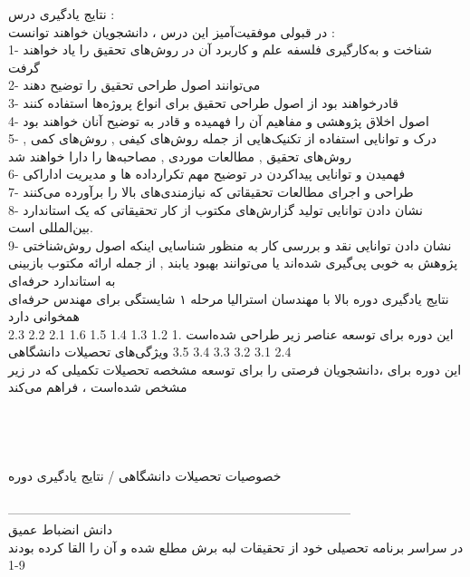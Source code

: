 \documentclass[a4 paper,12pt]{article}\usepackage{float, graphicx,xepersian }
\begin{document}
                                                     
                                                                                       \noindent                               
نتایج یادگیری درس :\\
در قبولی موفقیت‌آمیز این درس ، دانشجویان خواهند توانست : \\
1- شناخت و به‌کارگیری فلسفه علم و کاربرد آن در روش‌های تحقیق را یاد خواهند گرفت\\
2- می‌توانند اصول طراحی تحقیق را توضیح دهند\\
3- قادرخواهند بود از اصول طراحی تحقیق برای انواع پروژه‌ها استفاده کنند\\
4- اصول اخلاق پژوهشی و مفاهیم آن را فهمیده و قادر به توضیح آنان خواهند بود\\
5- درک و توانایی استفاده از تکنیک‌هایی از جمله روش‌های کیفی , روش‌های کمی , روش‌های تحقیق , مطالعات موردی , مصاحبه‌ها را دارا خواهند شد\\
6- فهمیدن و توانایی پیداکردن در توضیح مهم تکرارداده ها و مدیریت اداراکی\\
7-   طراحی و اجرای مطالعات تحقیقاتی که نیازمندی‌های بالا را برآورده می‌کنند \\
8- نشان دادن توانایی تولید گزارش‌های مکتوب از کار تحقیقاتی که یک استاندارد بین‌المللی است.\\
9- نشان دادن توانایی نقد و بررسی کار به منظور شناسایی اینکه اصول روش‌شناختی پژوهش به خوبی پی‌گیری شده‌اند یا می‌توانند بهبود یابند , از جمله ارائه مکتوب بازبینی به استاندارد حرفه‌ای \\
نتایج یادگیری دوره بالا با مهندسان استرالیا مرحله ۱ شایستگی برای مهندس حرفه‌ای همخوانی دارد \\
این دوره برای توسعه عناصر زیر طراحی شده‌است .1   1.2   1.3   1.4   1.5   1.6   2.1   2.2   2.3   2.4   3.1   3.2   3.3   3.4   3.5   
ویژگی‌های تحصیلات دانشگاهی\\
این دوره برای ،دانشجویان فرصتی را برای توسعه مشخصه تحصیلات تکمیلی که در زیر مشخص شده‌است ، فراهم می‌کند\\
\\
\\
\\
\\ 
خصوصیات تحصیلات دانشگاهی  /                              نتایج یادگیری دوره\\
\\    ---------------------------------------------------------------------------------
\\
دانش انضباط عمیق\\
در سراسر برنامه تحصیلی خود از تحقیقات لبه برش مطلع شده و آن را القا کرده بودند                                                            9-1\\
\end{document}
